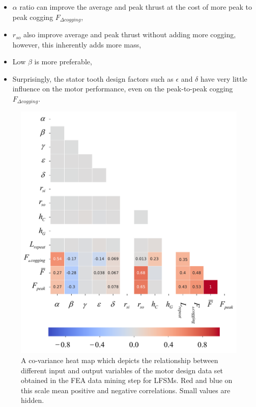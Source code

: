             
            \begin{itemize}
                \item $\alpha$ ratio can improve the average and peak thrust at the cost of more peak to peak cogging $F_{\Delta cogging}$,
                \item $r_{so}$ also improve average and peak thrust without adding more cogging, however, this inherently adds more mass,
                \item Low $\beta$ is more preferable,
                \item Surprisingly, the stator tooth design factors such as $\epsilon$ and $\delta$ have very little influence on the motor performance, even on the peak-to-peak cogging $F_{\Delta cogging}$.
            \end{itemize}
            
            
            \begin{figure}
                \centering
                \includegraphics[width=5in, trim=0 0 0 129mm, clip]{chap4/images2/heatmap.pdf}
                \caption{A co-variance heat map which depicts the relationship between different input and output variables of the motor design data set obtained in the \acs{FEA} data mining step for \acsp{LFSM}. Red and blue on this scale mean positive and negative correlations. Small values are hidden.}
                \label{fig:chap/rsm/LFSM/data mining/heat map}
            \end{figure}
        
